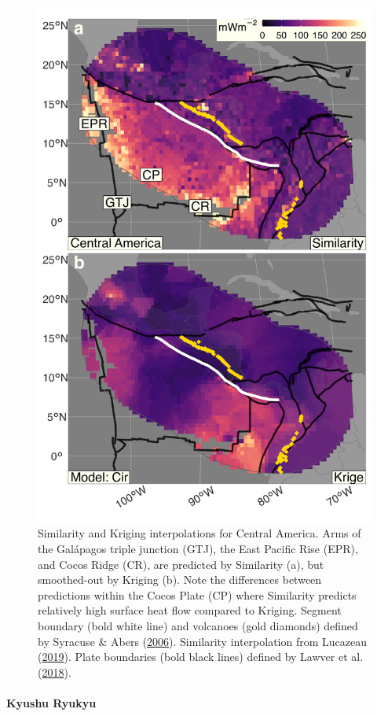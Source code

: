 \begin{figure}[htbp]

{\centering \includegraphics[width=0.69\linewidth,]{assets/figs/chpt3/CentralAmericaDiffComp} 

}

\caption[Similarity and Kriging interpolations for Central America]{Similarity and Kriging interpolations for Central America. Arms of the Galápagos triple junction (GTJ), the East Pacific Rise (EPR), and Cocos Ridge (CR), are predicted by Similarity (a), but smoothed-out by Kriging (b). Note the differences between predictions within the Cocos Plate (CP) where Similarity predicts relatively high surface heat flow compared to Kriging. Segment boundary (bold white line) and volcanoes (gold diamonds) defined by Syracuse \& Abers (\protect\hyperlink{ref-syracuse2006}{2006}). Similarity interpolation from Lucazeau (\protect\hyperlink{ref-lucazeau2019}{2019}). Plate boundaries (bold black lines) defined by Lawver et al. (\protect\hyperlink{ref-lawver2018}{2018}).}\label{fig:centralAmericaDiff}
\end{figure}

\hypertarget{kyushu-ryukyu}{%
\paragraph{Kyushu Ryukyu}\label{kyushu-ryukyu}}

